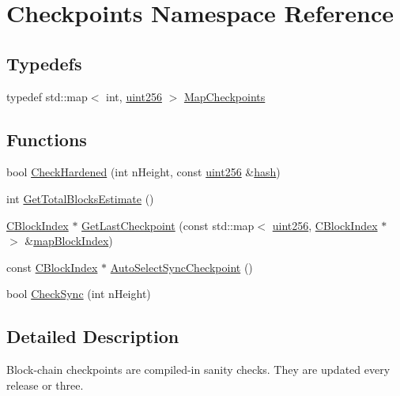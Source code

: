 \hypertarget{namespace_checkpoints}{}\section{Checkpoints Namespace Reference}
\label{namespace_checkpoints}
\subsection*{Typedefs}
\begin{DoxyCompactItemize}
\item 
typedef std\+::map$<$ int, \hyperlink{classuint256}{uint256} $>$ \hyperlink{namespace_checkpoints_a996cca530c4568a2eb4516e8f351b9a2}{Map\+Checkpoints}
\end{DoxyCompactItemize}
\subsection*{Functions}
\begin{DoxyCompactItemize}
\item 
bool \hyperlink{namespace_checkpoints_a896b098d769129c8e84c511f838baaa7}{Check\+Hardened} (int n\+Height, const \hyperlink{classuint256}{uint256} \&\hyperlink{cache_8cc_a11ecb029164e055f28f4123ce3748862}{hash})
\item 
int \hyperlink{namespace_checkpoints_ac4dc0a0ba00009be52fee3eef694c2c0}{Get\+Total\+Blocks\+Estimate} ()
\item 
\hyperlink{class_c_block_index}{C\+Block\+Index} $\ast$ \hyperlink{namespace_checkpoints_ad91375160e77c30d6e6ccbfe1c682195}{Get\+Last\+Checkpoint} (const std\+::map$<$ \hyperlink{classuint256}{uint256}, \hyperlink{class_c_block_index}{C\+Block\+Index} $\ast$ $>$ \&\hyperlink{main_8h_a9d5aa0c4581116d898ff51357a0df059}{map\+Block\+Index})
\item 
const \hyperlink{class_c_block_index}{C\+Block\+Index} $\ast$ \hyperlink{namespace_checkpoints_aa1915d9b1ed1c988b8477c3cc7ed1416}{Auto\+Select\+Sync\+Checkpoint} ()
\item 
bool \hyperlink{namespace_checkpoints_ab698c7033e4afdd7f7173bbe22b7c2c5}{Check\+Sync} (int n\+Height)
\end{DoxyCompactItemize}


\subsection{Detailed Description}
Block-\/chain checkpoints are compiled-\/in sanity checks. They are updated every release or three. 

